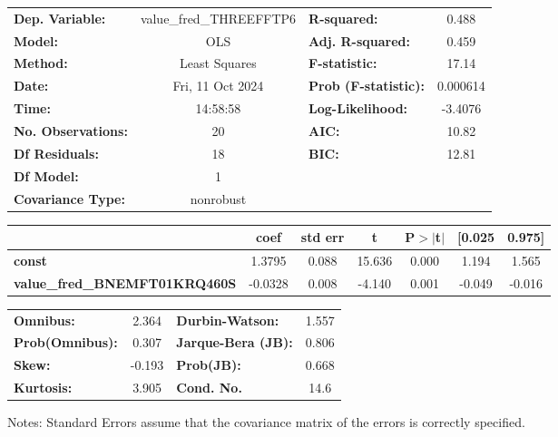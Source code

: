 \begin{center}
\begin{tabular}{lclc}
\toprule
\textbf{Dep. Variable:}               & value\_fred\_THREEFFTP6 & \textbf{  R-squared:         } &     0.488   \\
\textbf{Model:}                       &           OLS           & \textbf{  Adj. R-squared:    } &     0.459   \\
\textbf{Method:}                      &      Least Squares      & \textbf{  F-statistic:       } &     17.14   \\
\textbf{Date:}                        &     Fri, 11 Oct 2024    & \textbf{  Prob (F-statistic):} &  0.000614   \\
\textbf{Time:}                        &         14:58:58        & \textbf{  Log-Likelihood:    } &   -3.4076   \\
\textbf{No. Observations:}            &              20         & \textbf{  AIC:               } &     10.82   \\
\textbf{Df Residuals:}                &              18         & \textbf{  BIC:               } &     12.81   \\
\textbf{Df Model:}                    &               1         & \textbf{                     } &             \\
\textbf{Covariance Type:}             &        nonrobust        & \textbf{                     } &             \\
\bottomrule
\end{tabular}
\begin{tabular}{lcccccc}
                                      & \textbf{coef} & \textbf{std err} & \textbf{t} & \textbf{P$> |$t$|$} & \textbf{[0.025} & \textbf{0.975]}  \\
\midrule
\textbf{const}                        &       1.3795  &        0.088     &    15.636  &         0.000        &        1.194    &        1.565     \\
\textbf{value\_fred\_BNEMFT01KRQ460S} &      -0.0328  &        0.008     &    -4.140  &         0.001        &       -0.049    &       -0.016     \\
\bottomrule
\end{tabular}
\begin{tabular}{lclc}
\textbf{Omnibus:}       &  2.364 & \textbf{  Durbin-Watson:     } &    1.557  \\
\textbf{Prob(Omnibus):} &  0.307 & \textbf{  Jarque-Bera (JB):  } &    0.806  \\
\textbf{Skew:}          & -0.193 & \textbf{  Prob(JB):          } &    0.668  \\
\textbf{Kurtosis:}      &  3.905 & \textbf{  Cond. No.          } &     14.6  \\
\bottomrule
\end{tabular}
\end{center}

Notes: \newline
 [1] Standard Errors assume that the covariance matrix of the errors is correctly specified.